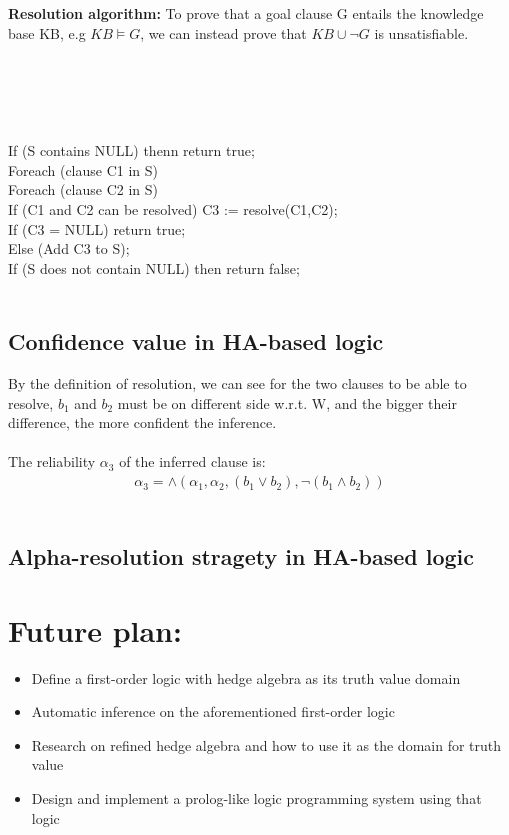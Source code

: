 \documentclass[26pt,fleqn,]{article}
\begin{document}
{\bfseries Resolution algorithm:} 
 To prove that a goal clause G entails the knowledge base KB, e.g \(KB \models G\), we can instead prove
that \(KB \cup \neg G\) is unsatisfiable.\\\\
\\
\\\\
\\
\indent If (S contains NULL) thenn return true;\\
\indent Foreach (clause C1 in S)\\
\indent \indent Foreach (clause C2 in S)\\
\indent \indent \indent If (C1 and C2 can be resolved) C3 := resolve(C1,C2);\\
\indent \indent \indent If (C3 = NULL) return true;\\
\indent \indent \indent Else (Add C3 to S);\\
\indent If (S does not contain NULL) then return false;\\
\\


\subsection{Confidence value in HA-based logic}
By the definition of resolution, we can see for the two clauses to be able to resolve, \(b_1\) and 
\(b_2\) must be on different side w.r.t. W, and the bigger their difference, the more confident the 
inference.\\\\
The reliability \({\alpha}_3\) of the inferred clause is:\\
\begin{align*}
	{\alpha}_3 = \wedge({\alpha}_1, {\alpha}_2, (b_1 \vee b_2), \neg(b_1 \wedge b_2))
\end{align*}
\\
\subsection{Alpha-resolution stragety in HA-based logic}
\section{Future plan:}
\begin{itemize}
	\item  Define a first-order logic with hedge algebra as its truth value domain
	\item  Automatic inference on the aforementioned first-order logic	
	\item  Research on refined hedge algebra and how to use it as the domain
		for truth value
	\item  Design and implement a prolog-like logic programming system using 
		that logic
\end{itemize}
\end{document}
